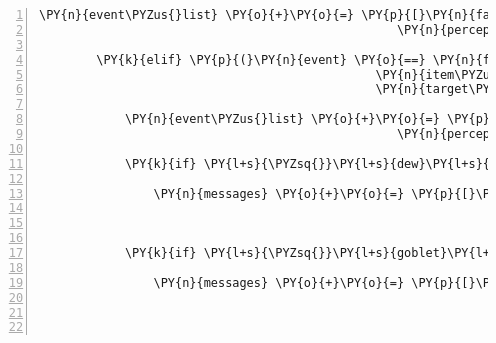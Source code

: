 \begin{Verbatim}[commandchars=\\\{\},numbers=left,firstnumber=1,stepnumber=1]
            \PY{n}{event\PYZus{}list} \PY{o}{+}\PY{o}{=} \PY{p}{[}\PY{n}{fabula}\PY{o}{.}\PY{n}{PerceptionEvent}\PY{p}{(}\PY{n}{identifier}\PY{o}{=}\PY{n}{ID\PYZus{}KUNI}\PY{p}{,}
                                                  \PY{n}{perception}\PY{o}{=}\PY{l+s}{\PYZsq{}}\PY{l+s}{Eine funktionierende Laute.}\PY{l+s}{\PYZsq{}}\PY{p}{)}\PY{p}{]}

        \PY{k}{elif} \PY{p}{(}\PY{n}{event} \PY{o}{==} \PY{n}{fabula}\PY{o}{.}\PY{n}{TriesToDropEvent}\PY{p}{(}\PY{n}{identifier}\PY{o}{=}\PY{n}{ID\PYZus{}KUNI}\PY{p}{,}
                                               \PY{n}{item\PYZus{}identifier}\PY{o}{=}\PY{l+s}{\PYZsq{}}\PY{l+s}{dew}\PY{l+s}{\PYZsq{}}\PY{p}{,}
                                               \PY{n}{target\PYZus{}identifier}\PY{o}{=}\PY{l+s}{\PYZsq{}}\PY{l+s}{goblet}\PY{l+s}{\PYZsq{}}\PY{p}{)}\PY{p}{)}\PY{p}{:}

            \PY{n}{event\PYZus{}list} \PY{o}{+}\PY{o}{=} \PY{p}{[}\PY{n}{fabula}\PY{o}{.}\PY{n}{PerceptionEvent}\PY{p}{(}\PY{n}{identifier}\PY{o}{=}\PY{n}{ID\PYZus{}KUNI}\PY{p}{,}
                                                  \PY{n}{perception}\PY{o}{=}\PY{l+s}{\PYZsq{}}\PY{l+s}{Der Kelch ist jetzt mit dem Tau gefüllt}\PY{l+s}{\PYZsq{}}\PY{p}{)}\PY{p}{]}

            \PY{k}{if} \PY{l+s}{\PYZsq{}}\PY{l+s}{dew}\PY{l+s}{\PYZsq{}} \PY{o+ow}{not} \PY{o+ow}{in} \PY{n}{room}\PY{o}{.}\PY{n}{entity\PYZus{}locations}\PY{o}{.}\PY{n}{keys}\PY{p}{(}\PY{p}{)}\PY{p}{:}

                \PY{n}{messages} \PY{o}{+}\PY{o}{=} \PY{p}{[}\PY{n}{fabula}\PY{o}{.}\PY{n}{Message}\PY{p}{(}\PY{p}{[}\PY{n}{fabula}\PY{o}{.}\PY{n}{DropsEvent}\PY{p}{(}\PY{n}{ID\PYZus{}KUNI}\PY{p}{,}
                                                               \PY{n+nb+bp}{self}\PY{o}{.}\PY{n}{host}\PY{o}{.}\PY{n}{rack}\PY{o}{.}\PY{n}{entity\PYZus{}dict}\PY{p}{[}\PY{l+s}{\PYZsq{}}\PY{l+s}{dew}\PY{l+s}{\PYZsq{}}\PY{p}{]}\PY{p}{,}
                                                               \PY{n}{room}\PY{o}{.}\PY{n}{entity\PYZus{}locations}\PY{p}{[}\PY{n}{ID\PYZus{}KUNI}\PY{p}{]}\PY{p}{)}\PY{p}{]}\PY{p}{)}\PY{p}{]}

            \PY{k}{if} \PY{l+s}{\PYZsq{}}\PY{l+s}{goblet}\PY{l+s}{\PYZsq{}} \PY{o+ow}{not} \PY{o+ow}{in} \PY{n}{room}\PY{o}{.}\PY{n}{entity\PYZus{}locations}\PY{o}{.}\PY{n}{keys}\PY{p}{(}\PY{p}{)}\PY{p}{:}

                \PY{n}{messages} \PY{o}{+}\PY{o}{=} \PY{p}{[}\PY{n}{fabula}\PY{o}{.}\PY{n}{Message}\PY{p}{(}\PY{p}{[}\PY{n}{fabula}\PY{o}{.}\PY{n}{DropsEvent}\PY{p}{(}\PY{n}{ID\PYZus{}KUNI}\PY{p}{,}
                                                               \PY{n+nb+bp}{self}\PY{o}{.}\PY{n}{host}\PY{o}{.}\PY{n}{rack}\PY{o}{.}\PY{n}{entity\PYZus{}dict}\PY{p}{[}\PY{l+s}{\PYZsq{}}\PY{l+s}{goblet}\PY{l+s}{\PYZsq{}}\PY{p}{]}\PY{p}{,}
                                                               \PY{n}{room}\PY{o}{.}\PY{n}{entity\PYZus{}locations}\PY{p}{[}\PY{n}{ID\PYZus{}KUNI}\PY{p}{]}\PY{p}{)}\PY{p}{]}\PY{p}{)}\PY{p}{]}


\end{Verbatim}
